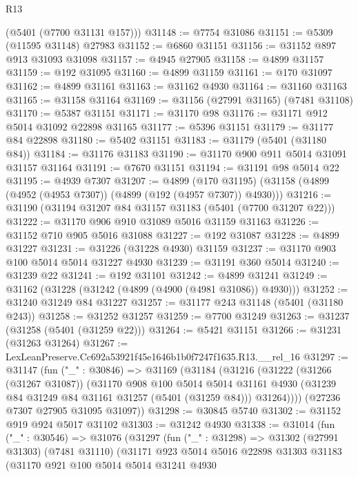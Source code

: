 \begin{lexlean}{R13}
\begin{coremodule}
      (@5401 (@7700 @31131 @157)))
@31148 := @7754 @31086
@31151 := @5309 (@11595 @31148) @27983
@31152 := @6860 @31151
@31156 := @31152 @897 @913 @31093 @31098
@31157 := @4945 @27905
@31158 := @4899 @31157
@31159 := @192 @31095
@31160 := @4899 @31159
@31161 := @170 @31097
@31162 := @4899 @31161
@31163 := @31162 @4930
@31164 := @31160 @31163
@31165 := @31158 @31164
@31169 := @31156 (@27991 @31165) (@7481 @31108)
@31170 := @5387 @31151
@31171 := @31170 @98
@31176 := @31171 @912 @5014 @31092 @22898 @31165
@31177 := @5396 @31151
@31179 := @31177 @84 @22898
@31180 := @5402 @31151
@31183 := @31179 (@5401 (@31180 @84))
@31184 := @31176 @31183
@31190 := @31170 @900 @911 @5014 @31091 @31157 @31164
@31191 := @7670 @31151
@31194 := @31191 @98 @5014 @22
@31195 := @4939 @7307
@31207 := @4899
    (@170 @31195)
    (@31158 (@4899 (@4952 (@4953 @7307)) (@4899 (@192 (@4957 @7307)) @4930)))
@31216 := @31190 (@31194 @31207 @84 @31157 @31183 (@5401 (@7700 @31207 @22)))
@31222 := @31170 @906 @910 @31089 @5016 @31159 @31163
@31226 := @31152 @710 @905 @5016 @31088
@31227 := @192 @31087
@31228 := @4899 @31227
@31231 := @31226 (@31228 @4930) @31159
@31237 := @31170 @903 @100 @5014 @5014 @31227 @4930
@31239 := @31191 @360 @5014
@31240 := @31239 @22
@31241 := @192 @31101
@31242 := @4899 @31241
@31249 := @31162 (@31228 (@31242 (@4899 (@4900 (@4981 @31086)) @4930)))
@31252 := @31240 @31249 @84 @31227
@31257 := @31177 @243 @31148 (@5401 (@31180 @243))
@31258 := @31252 @31257
@31259 := @7700 @31249
@31263 := @31237 (@31258 (@5401 (@31259 @22)))
@31264 := @5421 @31151
@31266 := @31231 (@31263 @31264)
@31267 := LexLeanPreserve.Cc692a53921f45e1646b1b0f7247f1635.R13.__rel_16
@31297 := @31147
    (fun ("_" : @30846) =>
    @31169
      (@31184
        (@31216
          (@31222
            (@31266 (@31267 @31087))
            (@31170
              @908
              @100
              @5014
              @5014
              @31161
              @4930
              (@31239 @84 @31249 @84 @31161 @31257 (@5401 (@31259 @84)))
              @31264))))
      (@27236 @7307 @27905 @31095 @31097))
@31298 := @30845 @5740
@31302 := @31152 @919 @924 @5017 @31102
@31303 := @31242 @4930
@31338 := @31014
    (fun ("_" : @30546) =>
    @31076
      (@31297
        (fun ("_" : @31298) =>
        @31302
          (@27991 @31303)
          (@7481 @31110)
          (@31171
            @923
            @5014
            @5016
            @22898
            @31303
            @31183
            (@31170
              @921
              @100
              @5014
              @5014
              @31241
              @4930

\end{coremodule}
\end{lexlean}
